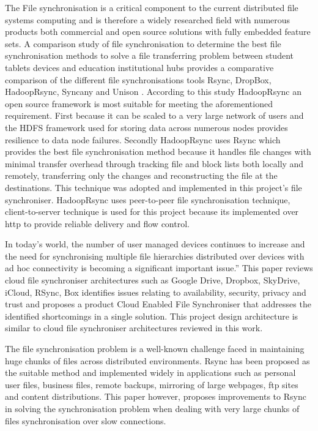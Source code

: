 \documentclass[11pt]{article}
\begin{document}
The File synchronisation is a critical component to the current distributed file systems computing and is therefore a widely researched field with numerous products both commercial and open source solutions with fully embedded feature sets. A comparison study of file synchronisation to determine the best file synchronisation methods to solve a file transferring problem between student tablets devices and education institutional hubs provides a comparative comparison of the different file synchronisations tools Rsync, DropBox, HadoopRsync, Syncany and Unison \cite{shiala:15}. According to this study HadoopRsync an open source framework is most suitable for meeting the aforementioned requirement. First because it can be scaled to a very large network of users and the HDFS framework used for storing data across numerous nodes provides resilience to data node failures. Secondly HadoopRsync uses Rsync \cite{suel:14} which provides the best file synchronisation method because it handles file changes with minimal transfer overhead through tracking file and block lists both locally and remotely, transferring only the changes and reconstructing the file at the destinations. This technique was adopted and implemented in this project's file synchroniser. HadoopRsync uses peer-to-peer file synchronisation technique, client-to-server technique is used for this project because its implemented over http to provide reliable delivery and flow control.

In today's world, the number of user managed devices continues to increase and the need for synchronising multiple file hierarchies distributed over devices with ad hoc connectivity is becoming a significant important issue.” \cite{shaikh:04} This paper reviews cloud file synchroniser architectures such as Google Drive, Dropbox, SkyDrive, iCloud, RSync, Box identifies issues relating to availability, security, privacy and trust and proposes a product Cloud Enabled File Synchroniser that addresses the identified shortcomings in a single solution. This project design architecture is similar to cloud file synchroniser architectures reviewed in this work.

The file synchronisation problem is a well-known challenge faced in maintaining huge chunks of files across distributed environments. Rsync \cite{shiala:15}\cite{shaikh:04} has been proposed as the suitable method and implemented widely in applications such as personal user files, business files, remote backups, mirroring of large webpages, ftp sites and content distributions. This paper \cite{shaikh:04} however, proposes improvements to Rsync in solving the synchronisation problem when dealing with very large chunks of files synchronisation over slow connections.
\end{document}
